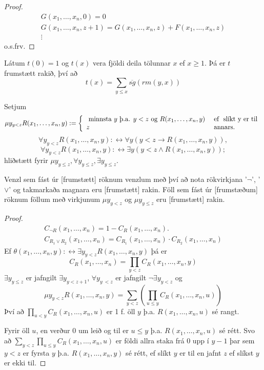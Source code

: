 \documentclass[12pt]{book}
\newcommand{\xxn}{x_1, \dotsc, x_n}
\begin{document}
\begin{proof}
  \begin{gather*}
    G(\xxn,0) = 0 \\
    G(\xxn, z+1) = G(\xxn,z) + F(\xxn,z)\\
    \vdots
  \end{gather*}
  o.s.frv.
\end{proof}


\begin{daemi}
  Látum $t(0) = 1$ og $t(x)$ vera fjöldi deila
  tölunnar $x$ ef $x \geq 1$. Þá er
  $t$ frumstætt rakið, því að
  \[t(x) = \sum_{y \leq x} \overline{sg}(rm(y,x))\]
\end{daemi}

\begin{skgr}
  Setjum
 \[\mu y_{y< z} R(\xxn,y) := \bcondef \text{ minnsta $y$ þ.a. $y < z$ og $R(\xxn,y)$} & \Ef \text{ slíkt y er til} \\ z & \text{ annars}. \econdef\]
 \[ \forall y_{y<z} R(\xxn,y): \leftrightarrow \forall y ( y < z \rightarrow R(\xxn,y)),\]
 \[ \forall y_{y<z} R(\xxn,y): \leftrightarrow \exists y ( y < z \wedge R(\xxn,y));\]
 hliðstætt fyrir $\mu y_{y \leq z}, \forall y_{y\leq z}, \exists y _{y \leq z}$.
\end{skgr}

\begin{setn}
  Venzl sem fást úr [frumstætt] röknum venzlum með því að nota rökvirkjana
  '$\lnot$', '$\vee$' og takmarkaða magnara  eru [frumstætt] rakin.
  Föll sem fást úr [frumstæðum] röknum föllum með virkjunum
  $\mu y_{y < z}$ og $\mu y_{y \leq z}$ eru [frumstætt] rakin.
\end{setn}

\begin{proof}
  \begin{gather*}
    C_{\lnot R} (\xxn) = 1 - C_R(\xxn). \\
    C_{R_1 \vee R_2} (\xxn) = C_{R_1} (\xxn) \cdot C_{R_2}(\xxn)
  \end{gather*}
  Ef $\theta(\xxn,y): \leftrightarrow \exists y_{y < z} R(\xxn,y)$ þá er
  \[ C_R(\xxn) = \prod_{y<z} C_R(\xxn, y)\]
  $\exists y_{y\leq z}$ er jafngilt $\exists y_{y <  z+1}$, $\forall y_{y\ < z}$
  er jafngilt $\lnot \exists y_{y <  z}$ og
  \[\mu y_{y <  z} R(\xxn, y) = \sum_{y<z} (\prod_{u \leq y} C_R (\xxn, u))\]
  Því að $ \prod_{u < y}C_R(\xxn,u)$ er 1 f. öll $y$ þ.a. $R(\xxn,u)$ sé rangt.

  Fyrir öll $u$, en verður $0$ um leið og til er $u \leq y$ þ.a. $R(\xxn,u)$
  sé rétt. Svo að $\sum_{y<z} \prod_{u \leq y} C_R(\xxn,u)$ er földi allra staka
  frá $0$ upp í $y-1$
  þar sem $y < z$ er fyrsta $y$ þ.a. $R(\xxn, y)$ sé rétt, ef slíkt $y$ er til 
  en jafnt $z$ ef slíkst $y$ er ekki til.
\end{proof}
\end{document}
